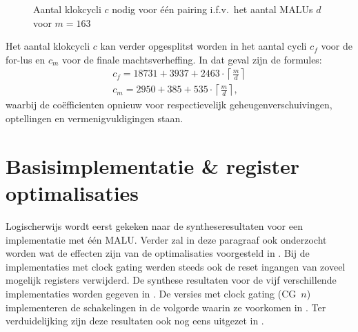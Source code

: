 \begin{figure}[h]
	\centering
		\caption{Aantal klokcycli $c$ nodig voor \'e\'en pairing i.f.v.\ het aantal MALUs $d$ voor $m = 163$\label{figuur-resultaten-multi-cycles}}
\end{figure}

Het aantal klokcycli $c$ kan verder opgesplitst worden in het aantal cycli $c_f$ voor de for-lus en $c_m$ voor de finale machtsverheffing. In dat geval zijn de formules:
\[\begin{gathered}
c_f = 18731 + 3937 + 2463 \cdot \left\lceil \frac{m}{d} \right\rceil\\
c_m = 2950 + 385 + 535 \cdot \left\lceil \frac{m}{d} \right\rceil,
\end{gathered}\]
waarbij de co\"efficienten opnieuw voor respectievelijk geheugenverschuivingen, optellingen en vermenigvuldigingen staan.

\section{Basisimplementatie \& register optimalisaties\label{section-resultaten-basisimplementatie}}

Logischerwijs wordt eerst gekeken naar de syntheseresultaten voor een implementatie met \'e\'en MALU. Verder zal in deze paragraaf ook onderzocht worden wat de effecten zijn van de optimalisaties voorgesteld in . Bij de implementaties met clock gating werden steeds ook de reset ingangen van zoveel mogelijk registers verwijderd. De synthese resultaten voor de vijf verschillende implementaties worden gegeven in . De versies met clock gating (CG~$n$) implementeren de schakelingen in de volgorde waarin ze voorkomen in . Ter verduidelijking zijn deze resultaten ook nog eens uitgezet in .


